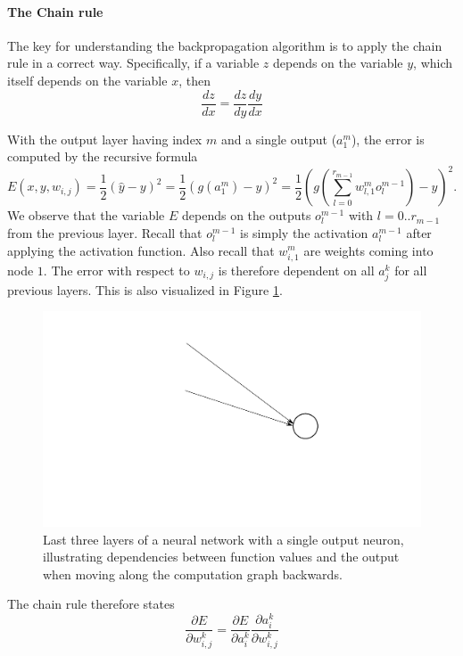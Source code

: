 \documentclass[paper=6.14in:9.21in,pagesize=pdftex,11pt,twoside,openright]{scrbook}
\begin{document}
\paragraph{The Chain rule} The key for understanding the backpropagation algorithm is to apply the chain rule in a correct way. Specifically, if a variable $z$ depends on the variable $y$, which itself depends on the variable $x$, then
\begin{equation}
\frac{dz}{dx}=\frac{dz}{dy}\frac{dy}{dx}
\end{equation}

With the output layer having index $m$ and a single output ($a^m_1$), the error is computed by the recursive formula
\begin{equation}
E(x,y,w_{i,j})=\frac{1}{2}(\hat{y}-y)^2=\frac{1}{2}(g(a_1^m)-y)^2=
\frac{1}{2}\left(g\left(\sum_{l=0}^{r_{m-1}}w_{l,1}^mo_l^{m-1}\right)-y\right)^2.
\end{equation}
We observe that the variable $E$ depends on the outputs $o_l^{m-1}$ with $l=0..r_{m-1}$ from the previous layer. Recall that $o_l^{m-1}$ is simply the activation $a_l^{m-1}$ after applying the activation function. Also recall that $w^m_{i,1}$ are weights coming into node $1$. The error with respect to $w_{i,j}$ is therefore dependent on all $a^k_j$ for all previous layers. This is also visualized in Figure \ref{fig:backpropnotation3}.

\begin{figure}[!htb]
\centering
\includegraphics[width=0.8\columnwidth]{figs/backpropnotation3}
\caption{Last three layers of a neural network with a single output neuron, illustrating dependencies between function values and the output when moving along the computation graph backwards.\label{fig:backpropnotation3}}
\end{figure}

The chain rule therefore states
\begin{equation}
\frac{\partial E}{\partial w_{i,j}^k}=\frac{\partial E}{\partial a_i^k}\frac{\partial a_i^k}{\partial w_{i,j}^k}
\end{equation}
\end{document}
